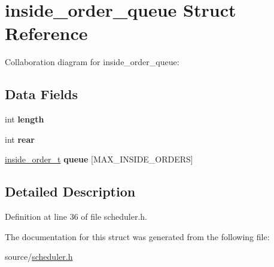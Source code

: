 \hypertarget{structinside__order__queue}{}\section{inside\+\_\+order\+\_\+queue Struct Reference}
\label{structinside__order__queue}


Collaboration diagram for inside\+\_\+order\+\_\+queue\+:
\subsection*{Data Fields}
\begin{DoxyCompactItemize}
\item 
\mbox{\label{structinside__order__queue_af25818967b7fcb1153ca2f3b0680526f}} 
int {\bfseries length}
\item 
\mbox{\label{structinside__order__queue_ab8e16f2ab4d7e5563e98981b4f5f0d54}} 
int {\bfseries rear}
\item 
\mbox{\label{structinside__order__queue_a4dd512cf1ce8c0f4d5ff0b8cacbfc6cd}} 
\hyperlink{structinside__order}{inside\+\_\+order\+\_\+t} {\bfseries queue} \mbox{[}M\+A\+X\+\_\+\+I\+N\+S\+I\+D\+E\+\_\+\+O\+R\+D\+E\+RS\mbox{]}
\end{DoxyCompactItemize}


\subsection{Detailed Description}


Definition at line 36 of file scheduler.\+h.



The documentation for this struct was generated from the following file\+:\begin{DoxyCompactItemize}
\item 
source/\hyperlink{scheduler_8h}{scheduler.\+h}\end{DoxyCompactItemize}
